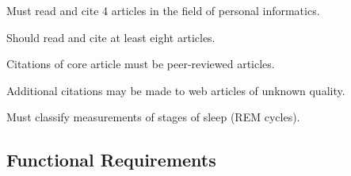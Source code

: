 \begin{reqtable}
  \reqheader

  {Must read and cite 4 articles in the field of personal informatics.}
  \phigh
  \sspec

  {Should read and cite at least eight articles.}
  \pmed
  \sspec

  {Citations of core article must be peer-reviewed articles.}
  \phigh
  \deps{\ref{req:4-articles}}
  \sspec

  {Additional citations may be made to web articles of unknown quality.}
  \plow
  \sspec

  {Must classify measurements of stages of sleep (REM cycles).}
  \phigh
\end{reqtable}

\subsection{Functional Requirements}\label{ssec:functional-requirements}

